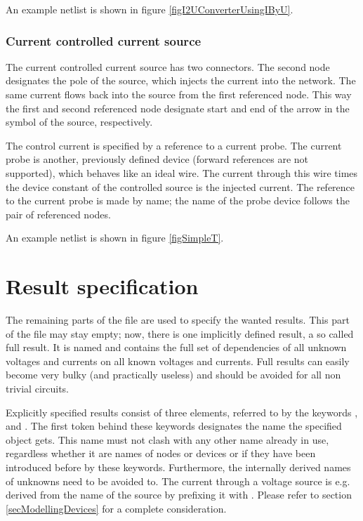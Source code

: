 An example netlist is shown in figure \ref{figI2UConverterUsingIByU}.


\subsubsection{Current controlled current source }

The current controlled current source  has two connectors. The
second node designates the pole of the source, which injects the current
into the network. The same current flows back into the source from the
first referenced node. This way the first and second referenced node
designate start and end of the arrow in the symbol of the source,
respectively.

The control current is specified by a reference to a current probe. The
current probe is another, previously defined device (forward references
are not supported), which behaves like an ideal wire. The current through
this wire times the device constant of the controlled source is the
injected current. The reference to the current probe is made by name; the
name of the probe device follows the pair of referenced nodes.

An example netlist is shown in figure \ref{figSimpleT}.


\section{Result specification}
\label{secResultSpec}

The remaining parts of the file are used to specify the wanted results.
This part of the file may stay empty; now, there is one implicitly defined
result, a so called full result. It is named  and
contains the full set of dependencies of all unknown voltages and currents
on all known voltages and currents. Full results can easily become very
bulky (and practically useless) and should be avoided for all non trivial
circuits.


Explicitly specified results consist of three elements, referred to by the
keywords ,  and . The first token behind these
keywords designates the name the specified object gets. This name must not
clash with any other name already in use, regardless whether it are names
of nodes or devices or if they have been introduced before by these
keywords. Furthermore, the internally derived names of unknowns need to be
avoided to. The current through a voltage source is e.g. derived from the
name of the source by prefixing it with . Please refer to section
\ref{secModellingDevices} for a complete consideration.


